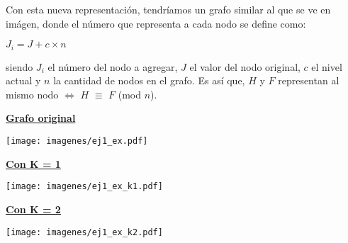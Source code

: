 \begin{algorithm}[H]
	\NoCaptionOfAlgo
	\caption{}
	
\end{algorithm}

Con esta nueva representación, tendríamos un grafo similar al que se ve en imágen, donde el número que representa a cada nodo se define como:

\begin{center}
	$J_i =	J + c \times n$
\end{center}

siendo $J_i$ el número del nodo a agregar, $J$ el valor del nodo original, $c$ el nivel actual y $n$ la cantidad de nodos en el grafo. Es así que, $H$ y $F$ representan al mismo nodo $\Leftrightarrow$ $H$ $\equiv$ $F$ (mod $n$).

\smallskip

\noindent
\begin{minipage}{0.2\textwidth}
	\begin{center}
		\underline{\textbf{Grafo original}}
		\newline

		\texttt{[image: imagenes/ej1\_ex.pdf]}
	\end{center}
\end{minipage}
\hfill
\begin{minipage}{0.3\textwidth}
	\begin{center}
		\underline{\textbf{Con K = 1}}
		\newline

		\texttt{[image: imagenes/ej1\_ex\_k1.pdf]}
	\end{center}
\end{minipage}
\hfill
\begin{minipage}{0.45\textwidth}
	\begin{center}
		\underline{\textbf{Con K = 2}}
		\newline

		\texttt{[image: imagenes/ej1\_ex\_k2.pdf]}
	\end{center}
\end{minipage}

